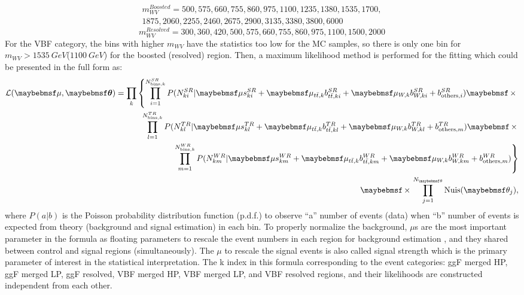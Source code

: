 \begin{multline}
m^{Boosted}_{WV}= 500, 575, 660, 755, 860, 975, 1100, 1235, 1380, 1535, 1700,\\ 1875, 2060, 2255, 2460, 2675, 2900, 3135, 3380, 3800, 6000
\end{multline}
\noindent
\begin{equation}
m^{Resolved}_{WV}= 300, 360, 420, 500, 575, 660, 755, 860, 975, 1100, 1500, 2000
\end{equation}
\noindent
For the VBF category, the bins with higher $m_{WV}$ have the statistics too low for the MC samples, so there is only one bin  for  $m_{WV}>1535~GeV$($1100~GeV$) for the boosted (resolved) region. Then, a maximum likelihood method is performed for the fitting which could be presented in the full form as:
 \begin{eqnarray}
 \label{Eq. ML_all}
 \mathcal{L}(\mu, \mbox{\boldmath $\theta$}) = \displaystyle\prod_{k} \left\{
 \displaystyle\prod_{i=1}^{N_{{\rm bins},k}^{SR}}P(N_{ki}^{SR}|\mu s_{ki}^{SR} + \mu_{t\bar{t},k} b_{t\bar{t},ki}^{SR} + \mu_{W,k} b_{W,ki}^{SR} + b_{{\rm others},i}^{SR})
 \times \right. \nonumber \\
 \displaystyle\prod_{l=1}^{N_{{\rm bins},k}^{TR}}P(N_{kl}^{TR}|\mu s_{kl}^{TR} + \mu_{t\bar{t},k} b_{t\bar{t},kl}^{TR} + \mu_{W,k} b_{W,kl}^{TR} + b_{{\rm others},m}^{TR})
 \times \nonumber \\
 \left. \displaystyle\prod_{m=1}^{N_{{\rm bins},k}^{WR}}P(N_{km}^{WR}|\mu s_{km}^{WR} + \mu_{t\bar{t},k} b_{t\bar{t},km}^{WR} + \mu_{W,k} b_{W,km}^{WR} + b_{{\rm others},m}^{WR})
 \right\} \nonumber \\
 \times\displaystyle\prod_{j=1}^{N_{\theta}}{\rm Nuis}(\theta_j),
 \label{Eq:likelihood}
 \end{eqnarray}
where $P(a|b)$ is the Poisson probability distribution function (p.d.f.) to observe ``a'' number of events (data) when ``b'' number of events is expected from theory (background and signal estimation) in each bin. To properly normalize the background, $\mu$s are the most important parameter in the formula as floating parameters to rescale the event numbers in each region for background estimation , and they shared between control and signal regions (simultaneously). The $\mu$ to rescale the signal events is also called signal strength which is the primary parameter of interest in the statistical interpretation. The k index in this formula corresponding to the event categories: ggF merged HP, ggF merged LP, ggF resolved, VBF merged HP, VBF merged LP, and VBF resolved regions, and their likelihoods are constructed independent from each other.

